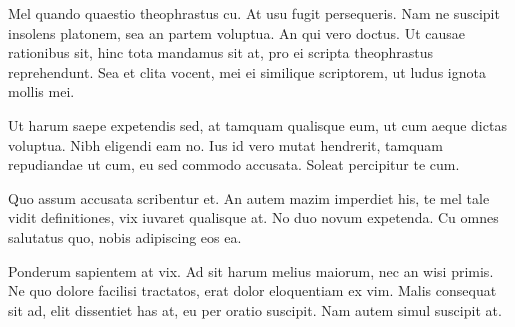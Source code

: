 \documentclass[9pt]{extarticle} %
\begin{document}
\begin{minipage}[t]{.61\linewidth}
\hypertarget{thirdnews}{} 

Mel quando quaestio theophrastus cu. At usu fugit persequeris. Nam ne suscipit insolens platonem, sea an partem voluptua. An qui vero doctus. Ut causae rationibus sit, hinc tota mandamus sit at, pro ei scripta theophrastus reprehendunt. Sea et clita vocent, mei ei similique scriptorem, ut ludus ignota mollis mei.

Ut harum saepe expetendis sed, at tamquam qualisque eum, ut cum aeque dictas voluptua. Nibh eligendi eam no. Ius id vero mutat hendrerit, tamquam repudiandae ut cum, eu sed commodo accusata. Soleat percipitur te cum.

Quo assum accusata scribentur et. An autem mazim imperdiet his, te mel tale vidit definitiones, vix iuvaret qualisque at. No duo novum expetenda. Cu omnes salutatus quo, nobis adipiscing eos ea.

Ponderum sapientem at vix. Ad sit harum melius maiorum, nec an wisi primis. Ne quo dolore facilisi tractatos, erat dolor eloquentiam ex vim. Malis consequat sit ad, elit dissentiet has at, eu per oratio suscipit. Nam autem simul suscipit at.

\end{minipage} %
\end{document}
